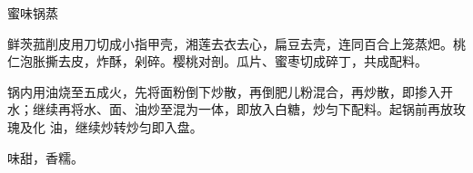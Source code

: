 %
%
%
%
%
%
%
\begin{recipe}[八宝锅蒸]{蜜味锅蒸}

\ingredients


\preparation

\step 鲜茨菰削皮用刀切成小指甲壳，湘莲去衣去心，扁豆去壳，连同百合上笼蒸𤆵。桃
仁泡胀撕去皮，炸酥，剁碎。樱桃对剖。瓜片、蜜枣切成碎丁，共成配料。

\step 锅内用油烧至五成火，先将面粉倒下炒散，再倒肥儿粉混合，再炒散，即掺入开
水；继续再将水、面、油炒至混为一体，即放入白糖，炒匀下配料。起锅前再放玫瑰及化
油，继续炒转炒匀即入盘。

\features

味甜，香糯。

\end{recipe}

